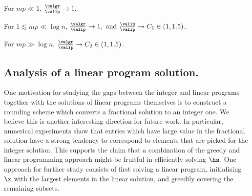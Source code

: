 \begin{conjecture}
For \(mp \ll 1\), \(
    \frac{\valgr}{\vallp} \to 1. \)
\end{conjecture}
\begin{conjecture}[Sparse]
For \(1 \lesssim mp \ll \log n\),
\(
    \frac{\valgr}{\valip} \to 1, \text{ and } \frac{\valip}{\vallp} \to C_1 \in (1, 1.5)\).
\end{conjecture}
\begin{conjecture}[Dense]
    For \(mp \gg \log n\), \(
        \frac{\valgr}{\valip} \to C_2 \in (1, 1.5)\).
\end{conjecture}
\subsection{Analysis of a linear program solution.}
One motivation for studying the gaps between the integer and linear programs together with the solutions of linear programs themselves is to construct a rounding scheme which converts a fractional solution to an integer one. 
We believe this is another interesting direction for future work. 
In particular, numerical experiments show that entries which have large value in the fractional solution have a strong tendency to correspond to elements that are picked for the integer solution. 
This supports the claim that a combination of the greedy and linear programming approach might be fruitful in efficiently solving $\hs$. 
One approach for further study consists of first solving a linear program, initializing $\x$ with the largest elements in the linear solution, and greedily covering the remaining subsets. 